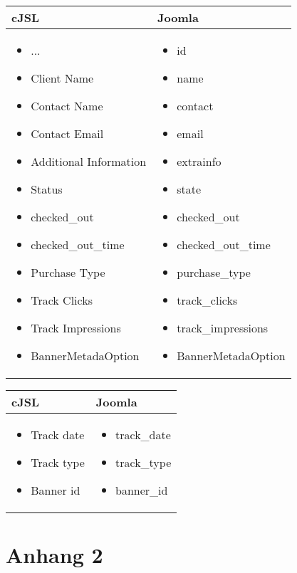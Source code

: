 \begin{minipage}{0.7\textwidth}
\begin{tabular}{|p{} | p{}|}
\hline
\textbf{cJSL} & \textbf{Joomla} \\ 
\hline
\begin{itemize}
\item ...
\item  Client Name
\item  Contact Name
\item  Contact Email
\item  Additional Information
\item  Status
\item  checked\_out
\item  checked\_out\_time
\item  Purchase Type
\item  Track Clicks
\item  Track Impressions
\item BannerMetadaOption
\end{itemize}
 & 
\begin{itemize}
\item id
\item  name
\item  contact
\item  email
\item  extrainfo
\item  state
\item  checked\_out
\item  checked\_out\_time
\item  purchase\_type
\item  track\_clicks
\item  track\_impressions
\item BannerMetadaOption
\end{itemize}
\\
\hline
\end{tabular}
\end{minipage}

\begin{minipage}{0.7\textwidth}
\begin{tabular}{|p{} | p{}|}
\hline
\textbf{cJSL} & \textbf{Joomla} \\ 
\hline
\begin{itemize}
\item Track date
\item Track type
\item Banner id
\end{itemize}
 & 
\begin{itemize}
\item track\_date
\item track\_type
\item banner\_id
\end{itemize}
\\
\hline
\end{tabular}
\end{minipage}
\chapter{Anhang 2}

